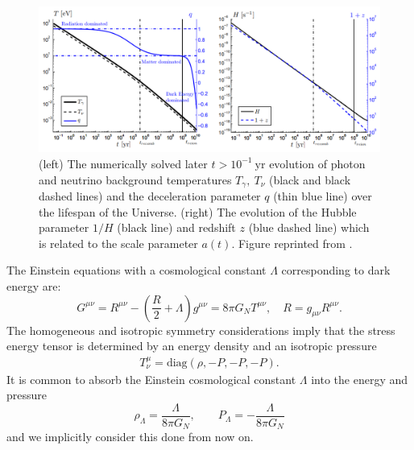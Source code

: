 \documentclass[universe,article,submit,moreauthors,pdftex,a4paper]{Definitions/mdpi}
\newcommand{\beqn}{\begin{equation}}
\newcommand{\eeqn}{\end{equation}}
\begin{document}
\begin{figure}[ht]
  \centering
  \includegraphics[width=\textwidth]{./plots/deceleration_evolution}
  \caption{ (left) The numerically solved later $t>10^{-1}\ \mathrm{yr}$ evolution of photon and neutrino background temperatures $T_{\gamma},\ T_{\nu}$ (black and black dashed lines) and the deceleration parameter $q$ (thin blue line) over the lifespan of the Universe. (right) The evolution of the Hubble parameter $1/H$ (black line) and redshift $z$ (blue dashed line) which is related to the scale parameter $a(t)$. Figure reprinted from \cite{Rafelski:2013yka}.}
  \label{deceleration_evolution} 
\end{figure}

The Einstein equations with a cosmological constant $\Lambda$ corresponding to dark energy are:
\beqn\label{Einstein}
G^{\mu\nu}=R^{\mu\nu}-\left(\frac R 2 +\Lambda\right) g^{\mu\nu}=8\pi G_N T^{\mu\nu},  
\quad R= g_{\mu\nu}R^{\mu\nu}.
\eeqn
The homogeneous and isotropic symmetry considerations imply that the stress energy tensor is determined by an energy density and an isotropic pressure
\begin{align}
 T^\mu_\nu =\mathrm{diag}(\rho, -P, -P, -P).
\end{align}
It is common to absorb the Einstein cosmological constant $\Lambda$ into the energy and pressure
\beqn\label{EpsLam}
\rho_\Lambda=\frac{\Lambda}{8\pi G_N}, \qquad P_\Lambda=-\frac{\Lambda}{8\pi G_N}
\eeqn
and we implicitly consider this done from now on.
\end{document}

